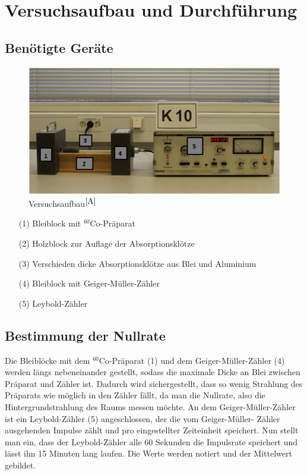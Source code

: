 \documentclass[fontsize=12pt]{scrartcl}
\begin{document}
\section{Versuchsaufbau und Durchführung}

\subsection{Benötigte Geräte}

\begin{figure}[h]
\centering
\includegraphics[scale=0.7]{Graphik/Versuchsaufbau}
\caption{Versuchsaufbau$^{\cite{A}}$}
\end{figure}

\begin{itemize}
\item[(1)] 	Bleiblock mit $^{60}$Co-Präparat
\item[(2)] 	Holzblock zur Auflage der Absorptionsklötze
\item[(3)] 	Verschieden dicke Absorptionsklötze aus Blei und Aluminium
\item[(4)] 	Bleiblock mit Geiger-Müller-Zähler
\item[(5)] 	Leybold-Zähler
\end{itemize}

\subsection{Bestimmung der Nullrate}
Die Bleiblöcke mit dem $^{60}$Co-Präparat (1) und dem Geiger-Müller-Zähler (4) werden längs nebeneinander gestellt, sodass die maximale Dicke an Blei 
zwischen Präparat und Zähler ist. Dadurch wird sichergestellt, dass so wenig Strahlung des Präparats wie möglich in den Zähler fällt, da man die Nullrate, also 
die Hintergrundstrahlung des Raums messen möchte. An dem Geiger-Müller-Zähler ist ein Leybold-Zähler (5) angeschlossen, der die vom Geiger-Müller-
Zähler ausgehenden Impulse zählt und pro eingestellter Zeiteinheit speichert. Nun stellt man ein, dass der Leybold-Zähler alle 60 Sekunden die Impulsrate 
speichert und lässt ihn 15 Minuten lang laufen. Die Werte werden notiert und der Mittelwert gebildet. \\
~\\
\end{document}
